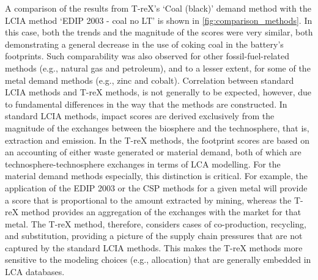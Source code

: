 A comparison of the results from T-reX's `Coal (black)' demand method with the LCIA method `EDIP 2003 - coal no LT' is shown in \autoref{fig:comparison_methods}. In this case, both the trends and the magnitude of the scores were very similar, both demonstrating a general decrease in the use of coking coal in the battery's footprints. Such comparability was also observed for other fossil-fuel-related methods (e.g., natural gas and petroleum), and to a lesser extent, for some of the metal demand methods (e.g., zinc and cobalt). Correlation between standard LCIA methods and T-reX methods, is not generally to be expected, however, due to fundamental differences in the way that the methods are constructed. In standard LCIA methods, impact scores are derived exclusively from the magnitude of the exchanges between the biosphere and the technosphere, that is, extraction and emission. In the T-reX methods, the footprint scores are based on an accounting of either waste generated or material demand, both of which are technosphere-technosphere exchanges in terms of LCA modelling. For the material demand methods especially, this distinction is critical. For example, the application of the EDIP 2003 or the CSP methods for a given metal will provide a score that is proportional to the amount extracted by mining, whereas the T-reX method provides an aggregation of the exchanges with the market for that metal. The T-reX method, therefore, considers cases of co-production, recycling, and substitution, providing a picture of the supply chain pressures that are not captured by the standard LCIA methods. This makes the T-reX methods more sensitive to the modeling choices (e.g., allocation) that are generally embedded in LCA databases.

